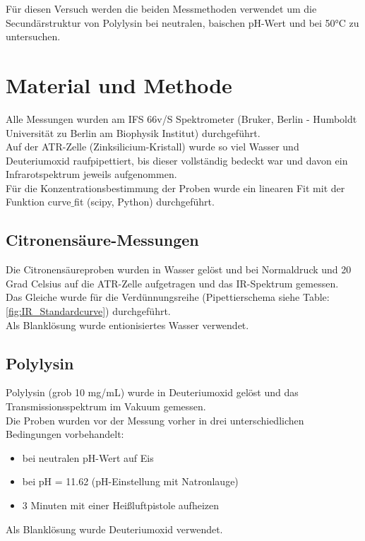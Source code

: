 \documentclass[10pt,a4paper]{article}
\begin{document}
	Für diesen Versuch werden die beiden Messmethoden verwendet um die Secundärstruktur von Polylysin bei neutralen, baischen pH-Wert und bei 50°C zu untersuchen.


	\section{Material und Methode}
	Alle Messungen wurden am IFS 66v/S Spektrometer (Bruker, Berlin - Humboldt Universität zu Berlin am Biophysik Institut) durchgeführt.\\
	Auf der ATR-Zelle (Zinksilicium-Kristall) wurde so viel Wasser und Deuteriumoxid raufpipettiert, bis dieser vollständig bedeckt war und davon ein Infrarotspektrum jeweils aufgenommen.\\
	Für die Konzentrationsbestimmung der Proben wurde ein linearen Fit mit der Funktion curve$\_$fit (scipy, Python) durchgeführt.\\
	
		\subsection{Citronensäure-Messungen}
		Die Citronensäureproben wurden in Wasser gelöst und bei Normaldruck und 20 Grad Celsius auf die ATR-Zelle aufgetragen und das IR-Spektrum gemessen.\\
		Das Gleiche wurde für die Verdünnungsreihe (Pipettierschema siehe Table: \ref{fig:IR_Standardcurve}) durchgeführt.\\
		Als Blanklösung wurde entionisiertes Wasser verwendet.\\
		
	
		\subsection{Polylysin}
		Polylysin (grob 10 mg/mL) wurde in Deuteriumoxid gelöst und das Transmissionsspektrum im Vakuum gemessen.\\
		Die Proben wurden vor der Messung vorher in drei unterschiedlichen Bedingungen vorbehandelt:
		\begin{itemize}
			\item bei neutralen pH-Wert auf Eis
			\item bei pH = 11.62 (pH-Einstellung mit Natronlauge)
			\item 3 Minuten mit einer Heißluftpistole aufheizen
		\end{itemize}
		Als Blanklösung wurde Deuteriumoxid verwendet.
	
\end{document}
